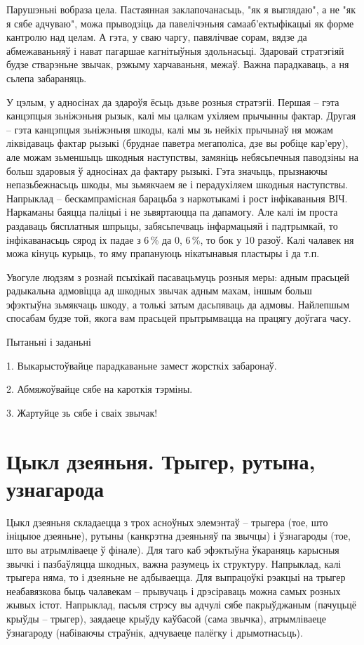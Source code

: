 Парушэньні вобраза цела. Пастаянная заклапочанасьць, "як я выглядаю", а не "як я сябе адчуваю", можа прыводзіць да павелічэньня самааб'ектыфікацыі як форме кантролю над целам. А гэта, у сваю чаргу, павялічвае сорам, вядзе да абмежаваньняў і нават пагаршае кагнітыўныя здольнасьці. Здаровай стратэгіяй будзе стварэньне звычак, рэжыму харчаваньня, межаў. Важна парадкаваць, а ня сьлепа забараняць.

У цэлым, у адносінах да здароўя ёсьць дзьве розныя стратэгіі. Першая – гэта канцэпцыя зьніжэньня рызык, калі мы цалкам ухіляем прычынны фактар. Другая – гэта канцэпцыя зьніжэньня шкоды, калі мы зь нейкіх прычынаў ня можам ліквідаваць фактар рызыкі (бруднае паветра мегаполіса, дзе вы робіце кар'еру), але можам зьменшыць шкодныя наступствы, замяніць небясьпечныя паводзіны на больш здаровыя ў адносінах да фактару рызыкі. Гэта значыць, прызнаючы непазьбежнасьць шкоды, мы зьмякчаем яе і перадухіляем шкодныя наступствы. Напрыклад – бескампрамісная барацьба з наркотыкамі і рост інфікаваньня ВІЧ. Наркаманы баяцца паліцыі і не зьвяртаюцца па дапамогу. Але калі ім проста раздаваць бясплатныя шпрыцы, забясьпечваць інфармацыяй і падтрымкай, то інфікаванасьць сярод іх падае з 6\,\% да 0, 6\,\%, то бок у 10 разоў. Калі чалавек ня можа кінуць курыць, то яму прапануюць нікатынавыя пластыры і да т.п.

Увогуле людзям з рознай псыхікай пасавацьмуць розныя меры: адным прасьцей радыкальна адмовіцца ад шкодных звычак адным махам, іншым больш эфэктыўна зьмякчаць шкоду, а толькі затым дасьпяваць да адмовы. Найлепшым спосабам будзе той, якога вам прасьцей прытрымвацца на працягу доўгага часу.

Пытаньні і заданьні

1. Выкарыстоўвайце парадкаваньне замест жорсткіх забаронаў.

2. Абмяжоўвайце сябе на кароткія тэрміны.

3. Жартуйце зь сябе і сваіх звычак!


\section{Цыкл дзеяньня. Трыгер, рутына, узнагарода}

Цыкл дзеяньня складаецца з трох асноўных элемэнтаў – трыгера (тое, што ініцыюе дзеяньне), рутыны (канкрэтна дзеяньняў па звычцы) і ўзнагароды (тое, што вы атрымліваеце ў фінале). Для таго каб эфэктыўна ўкараняць карысныя звычкі і пазбаўляцца шкодных, важна разумець іх структуру. Напрыклад, калі трыгера няма, то і дзеяньне не адбываецца. Для выпрацоўкі рэакцыі на трыгер неабавязкова быць чалавекам – прывучаць і дрэсіраваць можна самых розных жывых істот. Напрыклад, пасьля стрэсу вы адчулі сябе пакрыўджаным (пачуцьцё крыўды – трыгер), заядаеце крыўду каўбасой (сама звычка), атрымліваеце ўзнагароду (набіваючы страўнік, адчуваеце палёгку і дрымотнасьць).

